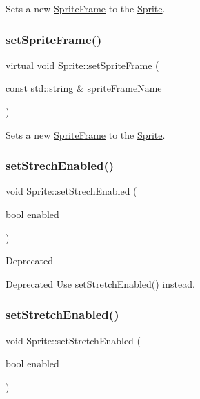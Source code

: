 Sets a new \hyperlink{classSpriteFrame}{Sprite\+Frame} to the \hyperlink{classSprite}{Sprite}. \mbox{\label{classSprite_ab2ffaa52af7443e063146265c2982b48}} 
\subsubsection{\texorpdfstring{set\+Sprite\+Frame()}{setSpriteFrame()}\hspace{0.1cm}{\footnotesize\ttfamily [2/2]}}
{\footnotesize\ttfamily virtual void Sprite\+::set\+Sprite\+Frame (\begin{DoxyParamCaption}\item[{const std\+::string \&}]{sprite\+Frame\+Name }\end{DoxyParamCaption})\hspace{0.3cm}{\ttfamily [virtual]}}

Sets a new \hyperlink{classSpriteFrame}{Sprite\+Frame} to the \hyperlink{classSprite}{Sprite}. \mbox{\label{classSprite_a17611e9c53231055f35bccd33d674bc9}} 
\subsubsection{\texorpdfstring{set\+Strech\+Enabled()}{setStrechEnabled()}}
{\footnotesize\ttfamily void Sprite\+::set\+Strech\+Enabled (\begin{DoxyParamCaption}\item[{bool}]{enabled }\end{DoxyParamCaption})}

\begin{DoxyRefDesc}{Deprecated}
\item[\hyperlink{deprecated__deprecated000274}{Deprecated}]Use \hyperlink{classSprite_a4f1659fc2090bfd0d849c707599ea7f3}{set\+Stretch\+Enabled()} instead. \end{DoxyRefDesc}
\mbox{\label{classSprite_a4f1659fc2090bfd0d849c707599ea7f3}} 
\subsubsection{\texorpdfstring{set\+Stretch\+Enabled()}{setStretchEnabled()}}
{\footnotesize\ttfamily void Sprite\+::set\+Stretch\+Enabled (\begin{DoxyParamCaption}\item[{bool}]{enabled }\end{DoxyParamCaption})}

